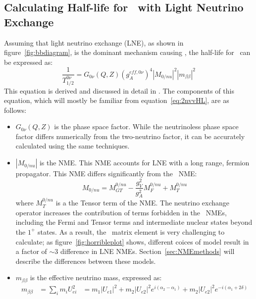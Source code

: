 \documentclass[/main.tex]{subfiles}
\begin{document}
\subsection{Calculating Half-life for \znbb\ with Light Neutrino Exchange}
Assuming that light neutrino exchange (LNE), as shown in figure~\ref{fig:bbdiagram}, is the dominant mechanism causing \znbb, the half-life for \znbb\ can be expressed as:
\begin{equation}
  \frac{1}{T^{0\nu}_{1/2}}=G_{0\nu}(Q,Z)(g_A^{eff,0\nu})^4|M_{0/nu}|^2|m_{\beta\beta}|^2
\end{equation}
This equation is derived and discussed in detail in \cite{Avignone2008, Engel2017}.
The components of this equation, which will mostly be familiar from equation~\ref{eq:2nvvHL}, are as follows:
\begin{itemize}
\item $G_{0\nu}(Q,Z)$ is the phase space factor.
  While the neutrinoless phase space factor differs numerically from the two-neutrino factor, it can be accurately calculated using the same techniques.
\item $|M_{0/nu}|$ is the NME.
  This NME accounts for LNE with a long range, fermion propagator.
  This NME differs significantly from the \tnbb\ NME:
  \begin{equation}
    M_{0/nu}=M^{0/nu}_{GT} - \frac{g_V^2}{g_A^2}M^{0/nu}_F+M^{0/nu}_T
  \end{equation}
  where $M^{0/nu}_T$ is a the Tensor term of the NME.
  The neutrino exchange operator increases the contribution of terms forbidden in the \tnbb\ NMEs, including the Fermi and Tensor terms and intermediate nuclear states beyond the $1^+$ states.
  As a result, the \znbb\ matrix element is very challenging to calculate; as figure~\ref{fig:horribleplot} shows, different coices of model result in a factor of $\sim3$ difference in LNE NMEs.
  Section~\ref{sec:NMEmethods} will describe the differences between these models.
\item $m_{\beta\beta}$ is the effective neutrino mass, expressed as:
  \begin{equation} \label{eq:mbb}
    \begin{aligned}
      m_{\beta\beta}&=\sum_i m_iU_{ei}^2
      &=m_1|U_{e1}|^2+m_2|U_{e2}|^2e^{i(\alpha_2-\alpha_1)}+m_2|U_{e2}|^2e^{-i(\alpha_1+2\delta)}
    \end{aligned}
  \end{equation}
  \begin{figure}[t]
    \centering

\end{figure}
\end{itemize}
\end{document}
